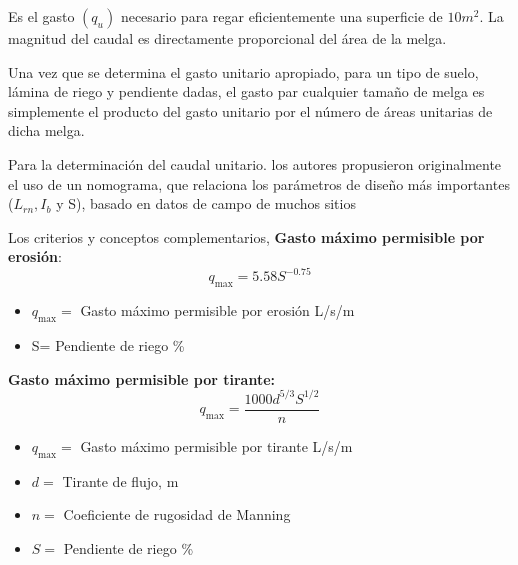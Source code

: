 \begin{definition}
    Es el gasto $(q_u)$ necesario para regar eficientemente una superficie de $10m^2$. La magnitud del caudal es directamente proporcional del área de la melga.
\end{definition}
Una vez que se determina el gasto unitario apropiado, para un tipo de suelo, lámina de riego y pendiente dadas, el gasto par cualquier tamaño de melga es simplemente el producto del gasto unitario por el número de áreas unitarias de dicha melga.

Para la determinación del caudal unitario. los autores propusieron originalmente el uso de un nomograma, que relaciona los parámetros de diseño más importantes ($L_{rn}, I_b$ y S), basado en datos de campo de muchos sitios

Los criterios y conceptos complementarios, \textbf{Gasto máximo permisible por erosión}:
\begin{equation}
    q_{\max}= 5.58S^{-0.75}
\end{equation}
\begin{notation}
    \begin{itemize}
        \item $q_{\max}=$ Gasto máximo permisible por erosión L/s/m
        \item S= Pendiente de riego \%
    \end{itemize}
\end{notation}
\textbf{Gasto máximo permisible por tirante:}
\begin{equation}
    q_{\max} = \frac{1000 d^{5/3}S^{1/2}}{n}
\end{equation}
\begin{notation}
    \begin{itemize}
        \item $q_{\max}=$ Gasto máximo permisible por tirante L/s/m
        \item $d=$ Tirante de flujo, m
        \item $n=$ Coeficiente de rugosidad de Manning
        \item $S=$ Pendiente de riego \%
    \end{itemize}
\end{notation}

